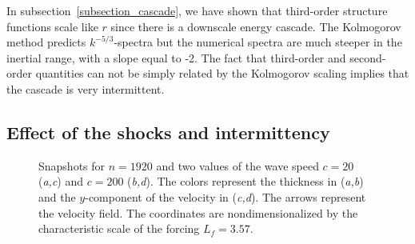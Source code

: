 


In subsection~\ref{subsection_cascade}, we have shown that third-order
structure functions scale like $r$ since there is a downscale energy
cascade.
%
The Kolmogorov method predicts $k^{-5/3}$-spectra but the numerical
spectra are much steeper in the inertial range, with a slope equal to
-2.  The fact that third-order and second-order quantities can not be
simply related by the Kolmogorov scaling implies that the cascade is
very intermittent.




\subsection{Effect of the shocks and intermittency}




\begin{figure}
\setlength{\halfwidth}{69mm}
\caption{
Snapshots for $n = 1920$ and two values of the wave speed 
$c= 20$ (\textit{a,c}) and $c= 200$ (\textit{b,d}).
The colors represent the thickness in (\textit{a,b}) and
the $y$-component of the velocity in (\textit{c,d}).
The arrows represent the velocity field.
%
The coordinates are nondimensionalized by the characteristic scale of
the forcing $L_f = 3.57$.  }
\label{fig_phys}
\end{figure}

